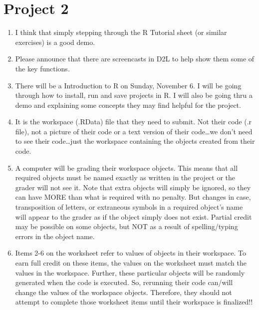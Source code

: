 \documentclass{article}
\begin{document}
\newpage

\section*{Project 2}

\begin{enumerate}

    \item I think that simply stepping through the R Tutorial sheet (or similar exercises) is a good demo.
    
    \item Please announce that there are screencasts in D2L to help show them some of the key functions.
    
    \item There will be a Introduction to R on Sunday, November 6. I will be going through how to install, run and save projects in R. I will also be going thru a demo and explaining some concepts they may find helpful for the project.
    
    \item It is the workspace (.RData) file that they need to submit. Not their code (.r file), not a picture of their code or a text version of their code\ldots we don’t need to see their code\ldots just the workspace containing the objects created from their code.
    
    \item A computer will be grading their workspace objects. This means that all required objects must be named exactly as written in the project or the grader will not see it. Note that extra objects will simply be ignored, so they can have MORE than what is required with no penalty. But changes in case, transposition of letters, or extraneous symbols in a required object’s name will appear to the grader as if the object simply does not exist. Partial credit may be possible on some objects, but NOT as a result of spelling/typing errors in the object name.
    
    \item Items 2-6 on the worksheet refer to values of objects in their workspace. To earn full credit on these items, the values on the worksheet must match the values in the workspace. Further, these particular objects will be randomly generated when the code is executed. So, rerunning their code can/will change the values of the workspace objects. Therefore, they should not attempt to complete those worksheet items until their workspace is finalized!!
    
\end{enumerate}
\end{document}

